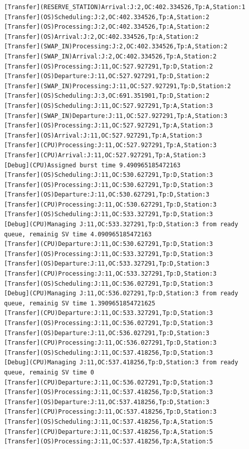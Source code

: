 \documentclass[12pt,a4paper]{article}
\begin{document}
\begin{lstlisting}
[Transfer](RESERVE_STATION)Arrival:J:2,OC:402.334526,Tp:A,Station:1
[Transfer](OS)Scheduling:J:2,OC:402.334526,Tp:A,Station:2
[Transfer](OS)Processing:J:2,OC:402.334526,Tp:A,Station:2
[Transfer](OS)Arrival:J:2,OC:402.334526,Tp:A,Station:2
[Transfer](SWAP_IN)Processing:J:2,OC:402.334526,Tp:A,Station:2
[Transfer](SWAP_IN)Arrival:J:2,OC:402.334526,Tp:A,Station:2
[Transfer](OS)Processing:J:11,OC:527.927291,Tp:D,Station:2
[Transfer](OS)Departure:J:11,OC:527.927291,Tp:D,Station:2
[Transfer](SWAP_IN)Processing:J:11,OC:527.927291,Tp:D,Station:2
[Transfer](OS)Scheduling:J:3,OC:691.351901,Tp:D,Station:2
[Transfer](OS)Scheduling:J:11,OC:527.927291,Tp:A,Station:3
[Transfer](SWAP_IN)Departure:J:11,OC:527.927291,Tp:A,Station:3
[Transfer](OS)Processing:J:11,OC:527.927291,Tp:A,Station:3
[Transfer](OS)Arrival:J:11,OC:527.927291,Tp:A,Station:3
[Transfer](CPU)Processing:J:11,OC:527.927291,Tp:A,Station:3
[Transfer](CPU)Arrival:J:11,OC:527.927291,Tp:A,Station:3
[Debug](CPU)Assigned burst time 9.490965185472163
[Transfer](OS)Scheduling:J:11,OC:530.627291,Tp:D,Station:3
[Transfer](OS)Processing:J:11,OC:530.627291,Tp:D,Station:3
[Transfer](OS)Departure:J:11,OC:530.627291,Tp:D,Station:3
[Transfer](CPU)Processing:J:11,OC:530.627291,Tp:D,Station:3
[Transfer](OS)Scheduling:J:11,OC:533.327291,Tp:D,Station:3
[Debug](CPU)Managing J:11,OC:533.327291,Tp:D,Station:3 from ready queue, remainig SV time 4.090965185472163
[Transfer](CPU)Departure:J:11,OC:530.627291,Tp:D,Station:3
[Transfer](OS)Processing:J:11,OC:533.327291,Tp:D,Station:3
[Transfer](OS)Departure:J:11,OC:533.327291,Tp:D,Station:3
[Transfer](CPU)Processing:J:11,OC:533.327291,Tp:D,Station:3
[Transfer](OS)Scheduling:J:11,OC:536.027291,Tp:D,Station:3
[Debug](CPU)Managing J:11,OC:536.027291,Tp:D,Station:3 from ready queue, remainig SV time 1.3909651854721625
[Transfer](CPU)Departure:J:11,OC:533.327291,Tp:D,Station:3
[Transfer](OS)Processing:J:11,OC:536.027291,Tp:D,Station:3
[Transfer](OS)Departure:J:11,OC:536.027291,Tp:D,Station:3
[Transfer](CPU)Processing:J:11,OC:536.027291,Tp:D,Station:3
[Transfer](OS)Scheduling:J:11,OC:537.418256,Tp:D,Station:3
[Debug](CPU)Managing J:11,OC:537.418256,Tp:D,Station:3 from ready queue, remainig SV time 0
[Transfer](CPU)Departure:J:11,OC:536.027291,Tp:D,Station:3
[Transfer](OS)Processing:J:11,OC:537.418256,Tp:D,Station:3
[Transfer](OS)Departure:J:11,OC:537.418256,Tp:D,Station:3
[Transfer](CPU)Processing:J:11,OC:537.418256,Tp:D,Station:3
[Transfer](OS)Scheduling:J:11,OC:537.418256,Tp:A,Station:5
[Transfer](CPU)Departure:J:11,OC:537.418256,Tp:A,Station:5
[Transfer](OS)Processing:J:11,OC:537.418256,Tp:A,Station:5

\end{lstlisting}
\end{document}
